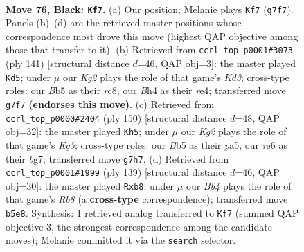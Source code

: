\documentclass[11pt]{article}
\begin{document}
\clearpage

\begin{figure}[p]\centering
\begin{subfigure}{0.46\textwidth}\centering
\resizebox{\linewidth}{!}{%
\newchessgame
\chessboard[
  setfen={8/R3n1k1/P3R3/1b3p2/5P1b/8/3r4/6K1 b - - 0 76},
  showmover=false,
  pgfstyle=straightmove, color=movearrow, markmove={g7-f7}
]}
\caption{}
\end{subfigure}\hfill
\begin{subfigure}{0.46\textwidth}\centering
\resizebox{\linewidth}{!}{%
\newchessgame
\chessboard[
  setfen={2R5/8/3k4/2p5/4RP2/3n2K1/8/3r4 b - - 0 71},
  showmover=false,
  pgfstyle=straightmove, color=movearrow, markmove={d6-d5}
]}
\caption{}
\end{subfigure}
\\[4pt]
\begin{subfigure}{0.46\textwidth}\centering
\resizebox{\linewidth}{!}{%
\newchessgame
\chessboard[
  setfen={8/6bk/3pB3/pr3NK1/1p5P/8/8/6R1 w - - 11 76},
  showmover=false,
  pgfstyle=straightmove, color=movearrow, markmove={g5-h5}
]}
\caption{}
\end{subfigure}\hfill
\begin{subfigure}{0.46\textwidth}\centering
\resizebox{\linewidth}{!}{%
\newchessgame
\chessboard[
  setfen={1R6/R3nk2/3K4/P7/8/7p/8/1r6 b - - 0 70},
  showmover=false,
  pgfstyle=straightmove, color=movearrow, markmove={b1-b8}
]}
\caption{}
\end{subfigure}
\caption{\textbf{Move 76, Black: \texttt{Kf7}.} (a) Our position; Melanie plays \texttt{Kf7} (\texttt{g7f7}). Panels (b)--(d) are the retrieved master positions whose correspondence most drove this move (highest QAP objective among those that transfer to it). (b) Retrieved from \texttt{ccrl\_top\_p0001\#3073} (ply 141) [structural distance $d$=46, QAP obj=3]: the master played \texttt{Kd5}; under $\mu$ our \emph{Kg2} plays the role of that game's \emph{Kd3}; cross-type roles: our \emph{B}b5 as their \emph{r}c8, our \emph{B}h4 as their \emph{r}e4; transferred move \texttt{g7f7} \textbf{(endorses this move)}. (c) Retrieved from \texttt{ccrl\_top\_p0000\#2404} (ply 150) [structural distance $d$=48, QAP obj=32]: the master played \texttt{Kh5}; under $\mu$ our \emph{Kg2} plays the role of that game's \emph{Kg5}; cross-type roles: our \emph{B}b5 as their \emph{p}a5, our \emph{r}e6 as their \emph{b}g7; transferred move \texttt{g7h7}. (d) Retrieved from \texttt{ccrl\_top\_p0001\#1999} (ply 139) [structural distance $d$=46, QAP obj=30]: the master played \texttt{Rxb8}; under $\mu$ our \emph{Bb4} plays the role of that game's \emph{Rb8} (a \textbf{cross-type} correspondence); transferred move \texttt{b5e8}. Synthesis: 1 retrieved analog transferred to \texttt{Kf7} (summed QAP objective 3, the strongest correspondence among the candidate moves); Melanie committed it via the \texttt{search} selector.}
\label{fig:thought-m151}
\end{figure}
\end{document}
